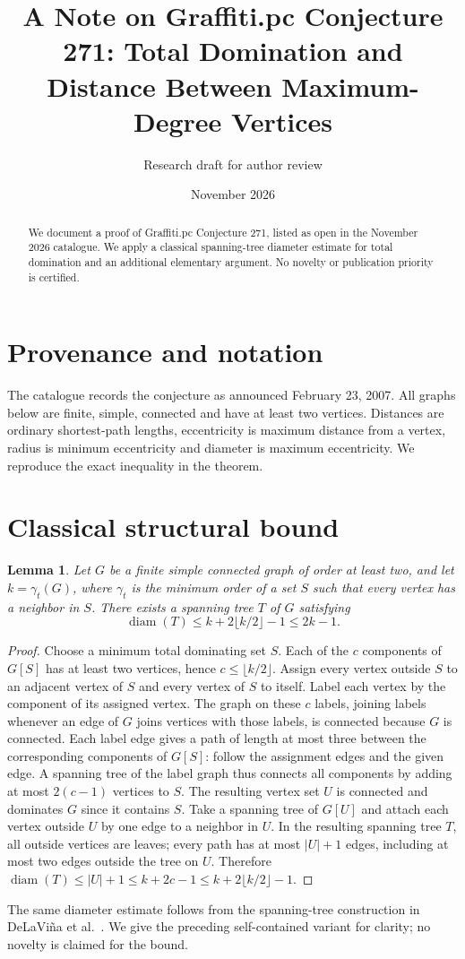 \documentclass[11pt]{article}
\title{A Note on Graffiti.pc Conjecture 271: Total Domination and Distance Between Maximum-Degree Vertices}
\author{Research draft for author review}
\date{November 2026}
\newtheorem{lemma}{Lemma}
\begin{document}
\maketitle
\begin{abstract}
We document a proof of Graffiti.pc Conjecture 271, listed as open in the November 2026 catalogue. We apply a classical spanning-tree diameter estimate for total domination and an additional elementary argument. No novelty or publication priority is certified.
\end{abstract}
\section{Provenance and notation}
The catalogue \cite{wow} records the conjecture as announced February 23, 2007. All graphs below are finite, simple, connected and have at least two vertices. Distances are ordinary shortest-path lengths, eccentricity is maximum distance from a vertex, radius is minimum eccentricity and diameter is maximum eccentricity. We reproduce the exact inequality in the theorem.
\section{Classical structural bound}
\begin{lemma}
Let $G$ be a finite simple connected graph of order at least two, and let $k=\gamma_t(G)$, where $\gamma_t$ is the minimum order of a set $S$ such that every vertex has a neighbor in $S$. There exists a spanning tree $T$ of $G$ satisfying
\[
 \operatorname{diam}(T)\le k+2\lfloor k/2\rfloor-1\le 2k-1.
\]
\end{lemma}
\begin{proof}
Choose a minimum total dominating set $S$. Each of the $c$ components of $G[S]$ has at least two vertices, hence $c\le\lfloor k/2\rfloor$. Assign every vertex outside $S$ to an adjacent vertex of $S$ and every vertex of $S$ to itself. Label each vertex by the component of its assigned vertex. The graph on these $c$ labels, joining labels whenever an edge of $G$ joins vertices with those labels, is connected because $G$ is connected. Each label edge gives a path of length at most three between the corresponding components of $G[S]$: follow the assignment edges and the given edge. A spanning tree of the label graph thus connects all components by adding at most $2(c-1)$ vertices to $S$. The resulting vertex set $U$ is connected and dominates $G$ since it contains $S$. Take a spanning tree of $G[U]$ and attach each vertex outside $U$ by one edge to a neighbor in $U$. In the resulting spanning tree $T$, all outside vertices are leaves; every path has at most $|U|+1$ edges, including at most two edges outside the tree on $U$. Therefore $\operatorname{diam}(T)\le |U|+1\le k+2c-1\le k+2\lfloor k/2\rfloor-1$.
\end{proof}
The same diameter estimate follows from the spanning-tree construction in DeLaVi\~na et al.\ \cite[Lemmas 2--3, equation (5)]{prior}. We give the preceding self-contained variant for clarity; no novelty is claimed for the bound.
\end{document}
